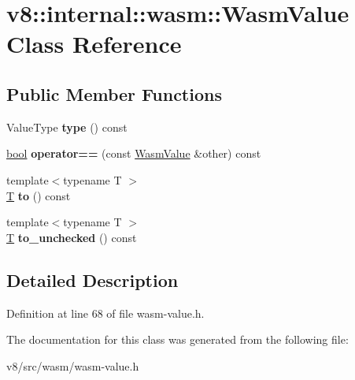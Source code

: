 \hypertarget{classv8_1_1internal_1_1wasm_1_1WasmValue}{}\section{v8\+:\+:internal\+:\+:wasm\+:\+:Wasm\+Value Class Reference}
\label{classv8_1_1internal_1_1wasm_1_1WasmValue}
\subsection*{Public Member Functions}
\begin{DoxyCompactItemize}
\item 
\mbox{\label{classv8_1_1internal_1_1wasm_1_1WasmValue_ac909695c67a9d2a2752b8ab6ff573f2b}} 
Value\+Type {\bfseries type} () const
\item 
\mbox{\label{classv8_1_1internal_1_1wasm_1_1WasmValue_a89ecdb5e6b66d0c9f4b03b9606baa63f}} 
\mbox{\hyperlink{classbool}{bool}} {\bfseries operator==} (const \mbox{\hyperlink{classv8_1_1internal_1_1wasm_1_1WasmValue}{Wasm\+Value}} \&other) const
\item 
\mbox{\label{classv8_1_1internal_1_1wasm_1_1WasmValue_abf7a9753acc8d24a4e8b41c705759a02}} 
{\footnotesize template$<$typename T $>$ }\\\mbox{\hyperlink{classv8_1_1internal_1_1torque_1_1T}{T}} {\bfseries to} () const
\item 
\mbox{\label{classv8_1_1internal_1_1wasm_1_1WasmValue_a114207861d563a99bf9e29083fbfdfb5}} 
{\footnotesize template$<$typename T $>$ }\\\mbox{\hyperlink{classv8_1_1internal_1_1torque_1_1T}{T}} {\bfseries to\+\_\+unchecked} () const
\end{DoxyCompactItemize}


\subsection{Detailed Description}


Definition at line 68 of file wasm-\/value.\+h.



The documentation for this class was generated from the following file\+:\begin{DoxyCompactItemize}
\item 
v8/src/wasm/wasm-\/value.\+h\end{DoxyCompactItemize}
